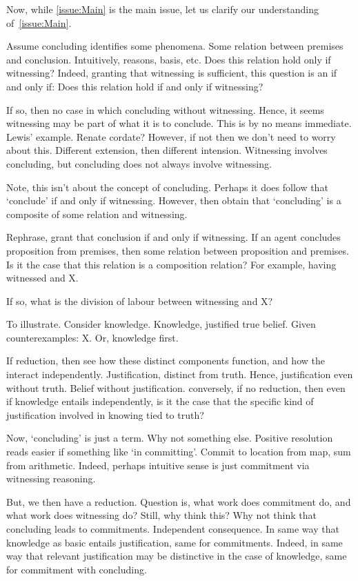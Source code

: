 \begin{note}
  Now, while \autoref{issue:Main} is the main issue, let us clarify our understanding of~\autoref{issue:Main}.

  Assume concluding identifies some phenomena.
  Some relation between premises and conclusion.
  Intuitively, reasons, basis, etc.
  Does this relation hold only if witnessing?
  Indeed, granting that witnessing is sufficient, this question is an if and only if:
  Does this relation hold if and only if witnessing?

  If so, then no case in which concluding without witnessing.
  Hence, it seems witnessing may be part of what it is to conclude.
  This is by no means immediate.
  Lewis' example.
  Renate cordate?
  However, if not then we don't need to worry about this.
  Different extension, then different intension.
  Witnessing involves concluding, but concluding does not always involve witnessing.

  Note, this isn't about the concept of concluding.
  Perhaps it does follow that `conclude' if and only if witnessing.
  However, then obtain that `concluding' is a composite of some relation and witnessing.

  Rephrase, grant that conclusion if and only if witnessing.
  If an agent concludes proposition from premises, then some relation between proposition and premises.
  Is it the case that this relation is a composition relation?
  For example, having witnessed and X.

  If so, what is the division of labour between witnessing and X?

  To illustrate.
  Consider knowledge.
  Knowledge, justified true belief.
  Given counterexamples:
  X.
  Or, knowledge first.

  If reduction, then see how these distinct components function, and how the interact independently.
  Justification, distinct from truth.
  Hence, justification even without truth.
  Belief without justification.
  conversely, if no reduction, then even if knowledge entails independently, is it the case that the specific kind of justification involved in knowing tied to truth?

  Now, `concluding' is just a term.
  Why not something else.
  Positive resolution reads easier if something like `in committing'.
  Commit to location from map, sum from arithmetic.
  Indeed, perhaps intuitive sense is just commitment via witnessing reasoning.

  But, we then have a reduction.
  Question is, what work does commitment do, and what work does witnessing do?
  Still, why think this?
  Why not think that concluding leads to commitments.
  Independent consequence.
  In same way that knowledge as basic entails justification, same for commitments.
  Indeed, in same way that relevant justification may be distinctive in the case of knowledge, same for commitment with concluding.


\end{note}
